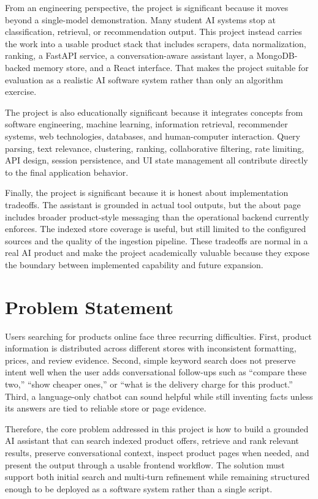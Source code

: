 \documentclass[12pt,a4paper,oneside]{report}
\begin{document}
From an engineering perspective, the project is significant because it moves beyond a single-model demonstration. Many student AI systems stop at classification, retrieval, or recommendation output. This project instead carries the work into a usable product stack that includes scrapers, data normalization, ranking, a FastAPI service, a conversation-aware assistant layer, a MongoDB-backed memory store, and a React interface. That makes the project suitable for evaluation as a realistic AI software system rather than only an algorithm exercise.

The project is also educationally significant because it integrates concepts from software engineering, machine learning, information retrieval, recommender systems, web technologies, databases, and human-computer interaction. Query parsing, text relevance, clustering, ranking, collaborative filtering, rate limiting, API design, session persistence, and UI state management all contribute directly to the final application behavior.

Finally, the project is significant because it is honest about implementation tradeoffs. The assistant is grounded in actual tool outputs, but the about page includes broader product-style messaging than the operational backend currently enforces. The indexed store coverage is useful, but still limited to the configured sources and the quality of the ingestion pipeline. These tradeoffs are normal in a real AI product and make the project academically valuable because they expose the boundary between implemented capability and future expansion.

\section{Problem Statement}
Users searching for products online face three recurring difficulties. First, product information is distributed across different stores with inconsistent formatting, prices, and review evidence. Second, simple keyword search does not preserve intent well when the user adds conversational follow-ups such as “compare these two,” “show cheaper ones,” or “what is the delivery charge for this product.” Third, a language-only chatbot can sound helpful while still inventing facts unless its answers are tied to reliable store or page evidence.

Therefore, the core problem addressed in this project is how to build a grounded AI assistant that can search indexed product offers, retrieve and rank relevant results, preserve conversational context, inspect product pages when needed, and present the output through a usable frontend workflow. The solution must support both initial search and multi-turn refinement while remaining structured enough to be deployed as a software system rather than a single script.
\end{document}
